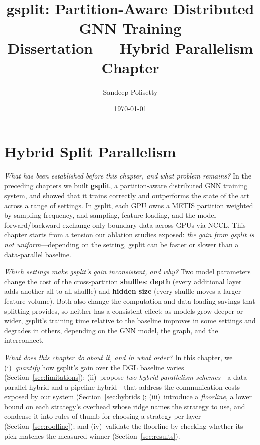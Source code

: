 \documentclass[11pt]{report}
\title{gsplit: Partition-Aware Distributed GNN Training\\[4pt]
       \large Dissertation --- Hybrid Parallelism Chapter}
\author{Sandeep Polisetty}
\date{\today}
\newcommand{\paraq}[1]{{\color{blue}\textit{#1}}\quad}
\begin{document}
\maketitle
\tableofcontents

\chapter{Hybrid Split Parallelism}

\paraq{What has been established before this chapter, and what problem remains?}
In the preceding chapters we built \textbf{gsplit}, a partition-aware distributed
GNN training system, and showed that it trains correctly and outperforms the state of the art
across a range of settings. In gsplit, each GPU owns a METIS partition weighted by sampling
frequency, and sampling, feature loading, and the model forward/backward exchange only
boundary data across GPUs via NCCL. This chapter starts from a tension our ablation studies exposed:
\emph{the gain from gsplit is not uniform}---depending on the setting, gsplit can be faster or slower
than a data-parallel baseline.

\paraq{Which settings make gsplit's gain inconsistent, and why?}
Two model parameters change the cost of the cross-partition \textbf{shuffles}:
\textbf{depth} (every additional layer adds another all-to-all shuffle) and
\textbf{hidden size} (every shuffle moves a larger feature volume). Both also change the computation
and data-loading savings that splitting provides, so neither has a consistent effect: as models grow
deeper or wider, gsplit's training time relative to the baseline improves in some settings and
degrades in others, depending on the GNN model, the graph, and the interconnect. 

\paraq{What does this chapter do about it, and in what order?}
In this chapter, we (i)~\emph{quantify} how gsplit's gain over the DGL baseline varies
(Section~\ref{sec:limitations}); (ii)~propose \emph{two hybrid parallelism
schemes}---a data-parallel hybrid and a pipeline hybrid---that address the communication costs exposed by our system
(Section~\ref{sec:hybrids}); (iii)~introduce a \emph{floorline}, a lower bound on each strategy's
overhead whose ridge names the strategy to use, and condense it into rules of thumb for choosing a
strategy per layer (Section~\ref{sec:roofline}); and (iv)~validate the floorline by checking
whether its pick matches the measured winner (Section~\ref{sec:results}).
\end{document}
